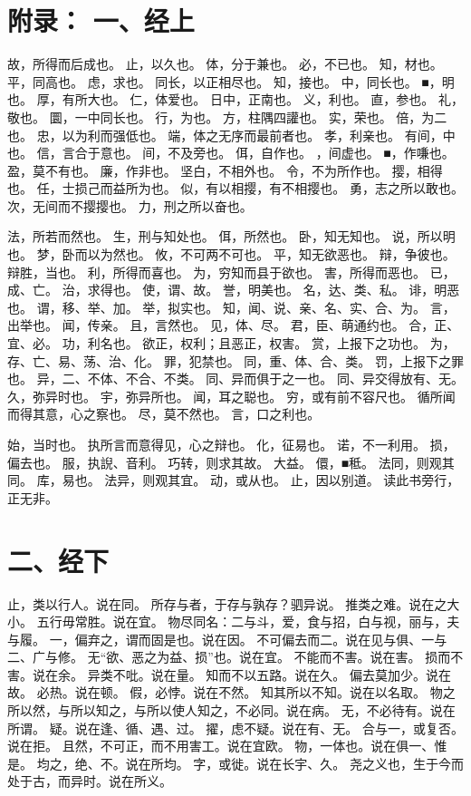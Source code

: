\documentclass[12pt,UTF8]{ctexbook}
\begin{document}
\chapter{附录： 一、经上}

故，所得而后成也。 
止，以久也。 
体，分于兼也。 
必，不已也。 
知，材也。 
平，同高也。 
虑，求也。 
同长，以正相尽也。 
知，接也。 
中，同长也。 
■，明也。 
厚，有所大也。 
仁，体爱也。 
日中，正南也。 
义，利也。 
直，参也。 
礼，敬也。 
圜，一中同长也。 
行，为也。 
方，柱隅四讙也。 
实，荣也。 
倍，为二也。 
忠，以为利而强低也。 
端，体之无序而最前者也。 
孝，利亲也。 
有间，中也。 
信，言合于意也。 
间，不及旁也。 
佴，自作也。 
，间虚也。 
■，作嗛也。 
盈，莫不有也。 
廉，作非也。 
坚白，不相外也。 
令，不为所作也。 
撄，相得也。 
任，士损己而益所为也。 
似，有以相撄，有不相撄也。 
勇，志之所以敢也。 
次，无间而不撄撄也。 
力，刑之所以奋也。 

法，所若而然也。 
生，刑与知处也。 
佴，所然也。 
卧，知无知也。 
说，所以明也。 
梦，卧而以为然也。 
攸，不可两不可也。 
平，知无欲恶也。 
辩，争彼也。辩胜，当也。 
利，所得而喜也。 
为，穷知而县于欲也。 
害，所得而恶也。 
已，成、亡。 
治，求得也。 
使，谓、故。 
誉，明美也。 
名，达、类、私。 
诽，明恶也。 
谓，移、举、加。 
举，拟实也。 
知，闻、说、亲、名、实、合、为。 
言，出举也。 
闻，传亲。 
且，言然也。 
见，体、尽。 
君，臣、萌通约也。 
合，正、宜、必。 
功，利名也。 
欲正，权利；且恶正，权害。 
赏，上报下之功也。 
为，存、亡、易、荡、治、化。 
罪，犯禁也。 
同，重、体、合、类。 
罚，上报下之罪也。 
异，二、不体、不合、不类。 
同、异而俱于之一也。 
同、异交得放有、无。 
久，弥异时也。 
宇，弥异所也。 
闻，耳之聪也。 
穷，或有前不容尺也。 
循所闻而得其意，心之察也。 
尽，莫不然也。 
言，口之利也。 

始，当时也。 
执所言而意得见，心之辩也。 
化，征易也。 
诺，不一利用。 
损，偏去也。 
服，执誽、音利。 
巧转，则求其故。 
大益。 
儇，■秪。 
法同，则观其同。 
库，易也。 
法异，则观其宜。 
动，或从也。 
止，因以别道。 
读此书旁行，正无非。 


\chapter{二、经下}

止，类以行人。说在同。 
所存与者，于存与孰存？驷异说。 
推类之难。说在之大小。 
五行毋常胜。说在宜。 
物尽同名：二与斗，爱，食与招，白与视，丽与，夫与履。 
一，偏弃之，谓而固是也。说在因。 
不可偏去而二。说在见与俱、一与二、广与修。 
无“欲、恶之为益、损”也。说在宜。 
不能而不害。说在害。 
损而不害。说在余。 
异类不吡。说在量。 
知而不以五路。说在久。 
偏去莫加少。说在故。 
必热。说在顿。 
假，必悖。说在不然。 
知其所以不知。说在以名取。 
物之所以然，与所以知之，与所以使人知之，不必同。说在病。 
无，不必待有。说在所谓。 
疑。说在逢、循、遇、过。 
擢，虑不疑。说在有、无。 
合与一，或复否。说在拒。 
且然，不可正，而不用害工。说在宜欧。 
物，一体也。说在俱一、惟是。 
均之，绝、不。说在所均。 
字，或徙。说在长宇、久。 
尧之义也，生于今而处于古，而异时。说在所义。 
\end{document}
